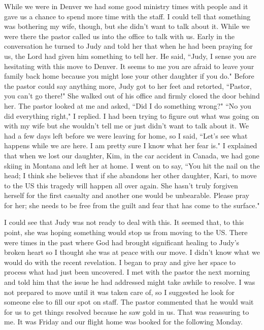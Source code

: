 \documentclass[oneside]{book}
\begin{document}
While we were in Denver we had some good ministry times with people and it gave us a chance to spend more time with the staff. I could tell that something was bothering my wife, though, but she didn't want to talk about it. While we were there the pastor called us into the office to talk with us. Early in the conversation he turned to Judy and told her that when he had been praying for us, the Lord had given him something to tell her. He said, ``Judy, I sense you are hesitating with this move to Denver. It seems to me you are afraid to leave your family back home because you might lose your other daughter if you do." Before the pastor could say anything more, Judy got to her feet and retorted, ``Pastor, you can't go there!" She walked out of his office and firmly closed the door behind her. The pastor looked at me and asked, ``Did I do something wrong?" ``No you did everything right," I replied. I had been trying to figure out what was going on with my wife but she wouldn't tell me or just didn't want to talk about it. We had a few days left before we were leaving for home, so I said, ``Let's see what happens while we are here. I am pretty sure I know what her fear is." I explained that when we lost our daughter, Kim, in the car accident in Canada, we had gone skiing in Montana and left her at home. I went on to say, ``You hit the nail on the head; I think she believes that if she abandons her other daughter, Kari, to move to the US this tragedy will happen all over again. She hasn't truly forgiven herself for the first casualty and another one would be unbearable. Please pray for her; she needs to be free from the guilt and fear that has come to the surface."

I could see that Judy was not ready to deal with this. It seemed that, to this point, she was hoping something would stop us from moving to the US. There were times in the past where God had brought significant healing to Judy's broken heart so I thought she was at peace with our move. I didn't know what we would do with the recent revelation. I began to pray and give her space to process what had just been uncovered. I met with the pastor the next morning and told him that the issue he had addressed might take awhile to resolve. I was not prepared to move until it was taken care of, so I suggested he look for someone else to fill our spot on staff. The pastor commented that he would wait for us to get things resolved because he saw gold in us. That was reassuring to me. It was Friday and our flight home was booked for the following Monday.
\end{document}
